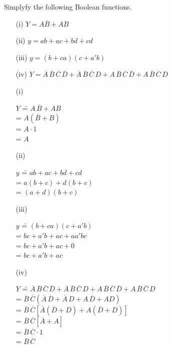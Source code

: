 \begin{problem}\label{prob5.56}
Simplyfy the following Boolean functions.
\begin{itemize}
\item[(i)] $Y=A\overline{B}+AB$

\item[(ii)] $y=ab+ac+bd+cd$

\item[(iii)] $y=(b+ca)(c+a'b)$

\item[(iv)] $Y=\overline{A}\,\overline{B}\,\overline{C}\,\overline{D}+\overline{A}\,\overline{B}\,\overline{C}\,D+A\,\overline{B}\,\overline{C}\,\overline{D}+A\,\overline{B}\,\overline{C}\,D$
\end{itemize}
\end{problem}

\begin{solution}
\begin{itemize}
\item[(i)]
\begin{tabbing}
\phantom{AAAAAA} $Y$ \== $A\,\overline{B}+AB$\\[3pt]
                       \>= $A(\overline{B}+B)$\\[3pt]
                       \>= $A\cdot 1$\\[3pt]
                       \>= $A$
\end{tabbing}

\item[(ii)] 
\begin{tabbing}
$y$ \== $ab+ac+bd+cd$\\[3pt]
    \>= $a(b+c)+d(b+c)$\\[3pt]
    \>= $(a+d)(b+c)$
\end{tabbing}

\item[(iii)]
\begin{tabbing}
$y$ \== $(b+ca)(c+a'b)$\\[3pt]
    \>= $bc+a'b+ac+aa'bc$\\[3pt]
    \>= $bc+a'b+ac+0$\\[3pt]
    \>= $bc+a'b+ac$
\end{tabbing}

\item[(iv)] 
\begin{tabbing}
$Y$ \== $\overline{A}\,\overline{B}\,\overline{C}\,\overline{D}+\overline{A}\,\overline{B}\,\overline{C}\,D+A\,\overline{B}\,\overline{C}\,\overline{D}+A\,\overline{B}\,\overline{C}\,D$\\[3pt]
    \>= $\overline{B}\,\overline{C}(\overline{A}\,\overline{D}+\overline{A}\,D+A\,\overline{D}+AD)$\\[3pt]
    \>= $\overline{B}\,\overline{C}[\overline{A}(\overline{D}+D)+A(\overline{D}+D)]$\\[3pt]
    \>= $\overline{B}\,\overline{C}[\overline{A}+A]$\\[3pt]
    \>= $\overline{B}\,\overline{C}\cdot 1$\\[3pt]
    \>= $\overline{B}\,\overline{C}$
\end{tabbing}
\end{itemize}
\end{solution}

